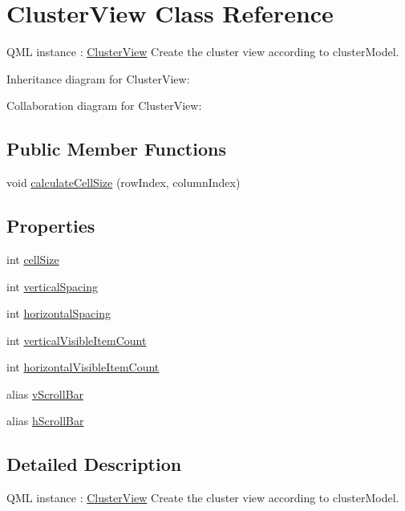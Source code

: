 \hypertarget{class_cluster_view}{}\section{Cluster\+View Class Reference}
\label{class_cluster_view}


Q\+ML instance \+: \hyperlink{class_cluster_view}{Cluster\+View} Create the cluster view according to cluster\+Model.  




Inheritance diagram for Cluster\+View\+:


Collaboration diagram for Cluster\+View\+:
\subsection*{Public Member Functions}
\begin{DoxyCompactItemize}
\item 
void \hyperlink{class_cluster_view_a123a487097e7146e7b0fb60bca7e2cd7}{calculate\+Cell\+Size} (row\+Index, column\+Index)
\end{DoxyCompactItemize}
\subsection*{Properties}
\begin{DoxyCompactItemize}
\item 
int \hyperlink{class_cluster_view_a5df2c23ff0eab7f33c129bb00d2947e6}{cell\+Size}
\item 
int \hyperlink{class_cluster_view_a532aaff60aeb8b9b0c222c9d6ada64c0}{vertical\+Spacing}
\item 
int \hyperlink{class_cluster_view_a05d3648344da5a01277e2e82cfcb879d}{horizontal\+Spacing}
\item 
int \hyperlink{class_cluster_view_a80e1fb4832dff80fd2ce4831eb4971c6}{vertical\+Visible\+Item\+Count}
\item 
int \hyperlink{class_cluster_view_a5edf5578114434ca59b2981df262a7e4}{horizontal\+Visible\+Item\+Count}
\item 
alias \hyperlink{class_cluster_view_aef0c0c03c1b1db966584d58474c21043}{v\+Scroll\+Bar}
\item 
alias \hyperlink{class_cluster_view_a8e8ef03db3807524639b4b9674b3e4e3}{h\+Scroll\+Bar}
\end{DoxyCompactItemize}


\subsection{Detailed Description}
Q\+ML instance \+: \hyperlink{class_cluster_view}{Cluster\+View} Create the cluster view according to cluster\+Model. 

